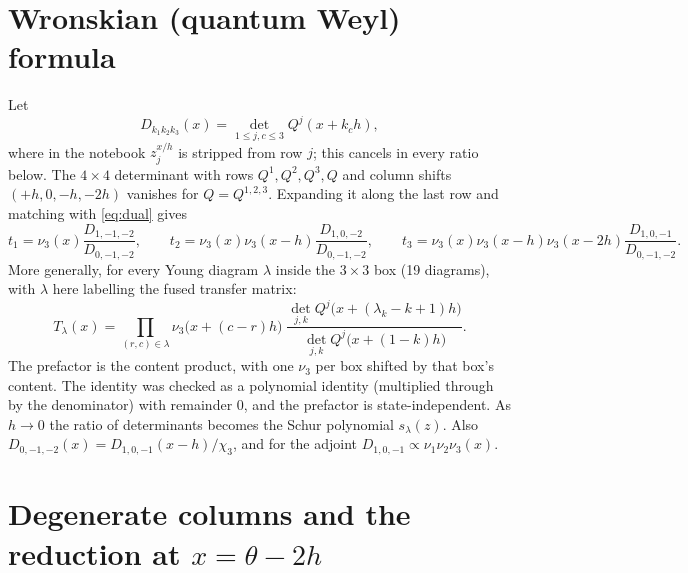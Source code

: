 \documentclass[11pt]{article}
\begin{document}
\section{Wronskian (quantum Weyl) formula}\label{sec:wronskian}

Let
\begin{equation}
D_{k_1k_2k_3}(x)=\det_{1\le j,c\le3}Q^j(x+k_ch),
\end{equation}
where in the notebook $z_j^{x/h}$ is stripped from row $j$; this cancels in every ratio below. The $4\times4$ determinant with rows $Q^1,Q^2,Q^3,Q$ and column shifts $(+h,0,-h,-2h)$ vanishes for $Q=Q^{1,2,3}$. Expanding it along the last row and matching with \eqref{eq:dual} gives
\begin{equation}
t_1=\nu_3(x)\frac{D_{1,-1,-2}}{D_{0,-1,-2}},\qquad t_2=\nu_3(x)\nu_3(x-h)\frac{D_{1,0,-2}}{D_{0,-1,-2}},\qquad t_3=\nu_3(x)\nu_3(x-h)\nu_3(x-2h)\frac{D_{1,0,-1}}{D_{0,-1,-2}}.
\end{equation}
More generally, for every Young diagram $\lambda$ inside the $3\times3$ box (19 diagrams), with $\lambda$ here labelling the fused transfer matrix:
\begin{equation}\label{eq:weyl}
T_\lambda(x)=\prod_{(r,c)\in\lambda}\nu_3\big(x+(c-r)h\big)\;\frac{\det_{j,k}Q^j\big(x+(\lambda_k-k+1)h\big)}{\det_{j,k}Q^j\big(x+(1-k)h\big)} .
\end{equation}
The prefactor is the content product, with one $\nu_3$ per box shifted by that box's content. The identity was checked as a polynomial identity (multiplied through by the denominator) with remainder $0$, and the prefactor is state-independent. As $h\to0$ the ratio of determinants becomes the Schur polynomial $s_\lambda(z)$. Also $D_{0,-1,-2}(x)=D_{1,0,-1}(x-h)/\chi_3$, and for the adjoint $D_{1,0,-1}\propto\nu_1\nu_2\nu_3(x)$.

\section{Degenerate columns and the reduction at $x=\theta-2h$}\label{sec:reduction}
\end{document}
